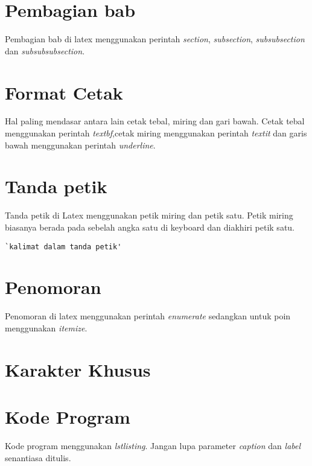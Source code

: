 \section{Pembagian bab}
Pembagian bab di latex menggunakan perintah \textit{section}, \textit{subsection}, \textit{subsubsection} dan \textit{subsubsubsection}.


\section{Format Cetak}
Hal paling mendasar antara lain cetak tebal, miring dan gari bawah. Cetak tebal menggunakan perintah \textit{textbf},cetak miring menggunakan perintah \textit{textit} dan garis bawah menggunakan perintah \textit{underline}.

\section{Tanda petik}
Tanda petik di Latex menggunakan petik miring dan petik satu. Petik miring biasanya berada pada sebelah angka satu di keyboard dan diakhiri petik satu.

\begin{lstlisting}[caption=Contoh kalimat dalam tanda petik di Latex,label={lst:tandapetik}]
`kalimat dalam tanda petik'
\end{lstlisting}

\section{Penomoran}
Penomoran di latex menggunakan perintah \textit{enumerate} sedangkan untuk poin menggunakan \textit{itemize}.

\section{Karakter Khusus}


\section{Kode Program}
Kode program menggunakan \textit{lstlisting}. Jangan lupa parameter \textit{caption} dan \textit{label} senantiasa ditulis.

